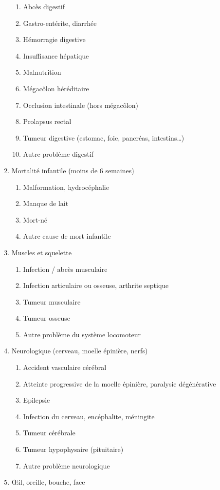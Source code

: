 ﻿\documentclass[a4paper,10pt]{article}
\begin{document}
\begin{enumerate}
\begin{enumerate}
\item Abcès digestif
\item Gastro-entérite, diarrhée
\item Hémorragie digestive
\item Insuffisance hépatique
\item Malnutrition
\item Mégacôlon héréditaire
\item Occlusion intestinale (hors mégacôlon)
\item Prolapsus rectal
\item Tumeur digestive (estomac, foie, pancréas, intestins…)
\item Autre problème digestif
\end{enumerate}
\item Mortalité infantile (moins de 6 semaines)
\begin{enumerate}
\item Malformation, hydrocéphalie
\item Manque de lait
\item Mort-né
\item Autre cause de mort infantile
\end{enumerate}
\item Muscles et squelette
\begin{enumerate}
\item Infection / abcès musculaire
\item Infection articulaire ou osseuse, arthrite septique
\item Tumeur musculaire
\item Tumeur osseuse
\item Autre problème du système locomoteur
\end{enumerate}
\item Neurologique (cerveau, moelle épinière, nerfs)
\begin{enumerate}
\item Accident vasculaire cérébral
\item Atteinte progressive de la moelle épinière, paralysie dégénérative
\item Epilepsie
\item Infection du cerveau, encéphalite, méningite
\item Tumeur cérébrale
\item Tumeur hypophysaire (pituitaire)
\item Autre problème neurologique
\end{enumerate} 
\item Œil, oreille, bouche, face

\end{enumerate}
\end{document}
